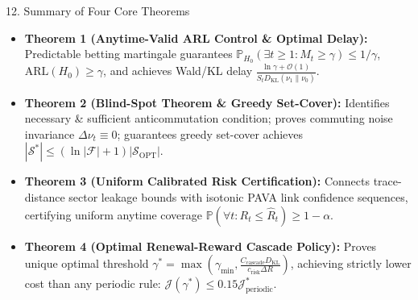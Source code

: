 \documentclass[aspectratio=169, 10pt]{beamer}
\begin{document}
\begin{frame}{12. Summary of Four Core Theorems}
    \begin{itemize}
        \item \textbf{Theorem 1 (Anytime-Valid ARL Control \& Optimal Delay):} Predictable betting martingale guarantees $\mathbb{P}_{H_0}(\exists t \ge 1: M_t \ge \gamma) \le 1/\gamma$, $\mathrm{ARL}(H_0) \ge \gamma$, and achieves Wald/KL delay $\frac{\ln \gamma + \mathcal{O}(1)}{S_t D_{\mathrm{KL}}(\nu_1 \parallel \nu_0)}$.
        \item \textbf{Theorem 2 (Blind-Spot Theorem \& Greedy Set-Cover):} Identifies necessary \& sufficient anticommutation condition; proves commuting noise invariance $\Delta \nu_t \equiv 0$; guarantees greedy set-cover achieves $|\mathcal{S}^*| \le (\ln|\mathcal{F}| + 1)|\mathcal{S}_{\mathrm{OPT}}|$.
        \item \textbf{Theorem 3 (Uniform Calibrated Risk Certification):} Connects trace-distance sector leakage bounds with isotonic PAVA link confidence sequences, certifying uniform anytime coverage $\mathbb{P}(\forall t: R_t \le \hat{R}_t) \ge 1 - \alpha$.
        \item \textbf{Theorem 4 (Optimal Renewal-Reward Cascade Policy):} Proves unique optimal threshold $\gamma^* = \max(\gamma_{\min}, \frac{C_{\mathrm{cascade}} D_{\mathrm{KL}}}{c_{\mathrm{risk}} \Delta R})$, achieving strictly lower cost than any periodic rule: $\mathcal{J}(\gamma^*) \le 0.15 \mathcal{J}^*_{\mathrm{periodic}}$.
    \end{itemize}
\end{frame}
\end{document}
